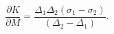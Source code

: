 \begin{equation}
\frac{\partial K}{\partial M}  
= \frac{\Delta_1 \Delta_2(\sigma_1 - \sigma_2)}{(\Delta_2 - \Delta_1)} .
\end{equation}

